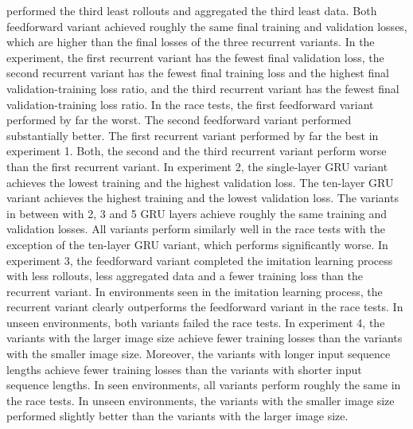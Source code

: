 performed the third least rollouts and aggregated the third least data.
Both feedforward variant achieved roughly the same final training and validation losses,
which are higher than the final losses of the three recurrent variants.
In the experiment, the first recurrent variant has the fewest final validation loss,
the second recurrent variant has the fewest final training loss
and the highest final validation-training loss ratio,
and the third recurrent variant has the fewest final validation-training loss ratio.
In the race tests,
the first feedforward variant performed by far the worst.
The second feedforward variant performed substantially better.
The first recurrent variant performed by far the best in experiment 1.
Both, the second and the third recurrent variant
perform worse than the first recurrent variant.
In experiment 2, 
the single-layer GRU variant achieves the lowest training
and the highest validation loss.
The ten-layer GRU variant achieves the highest training
and the lowest validation loss.
The variants in between with 2, 3 and 5 GRU layers 
achieve roughly the same training and validation losses.
All variants perform similarly well in the race tests
with the exception of the ten-layer GRU variant,
which performs significantly worse.
In experiment 3, 
the feedforward variant completed the imitation learning process
with less rollouts, less aggregated data 
and a fewer training loss than the recurrent variant.
In environments seen in the imitation learning process,
the recurrent variant clearly outperforms the feedforward variant in the race tests.
In unseen environments, both variants failed the race tests.
In experiment 4,
the variants with the larger image size achieve fewer training losses
than the variants with the smaller image size.
Moreover, the variants with longer input sequence lengths achieve
fewer training losses than the variants with shorter input sequence lengths.
In seen environments,
all variants perform roughly the same in the race tests.
In unseen environments, the variants with the smaller image size performed slightly better
than the variants with the larger image size.










